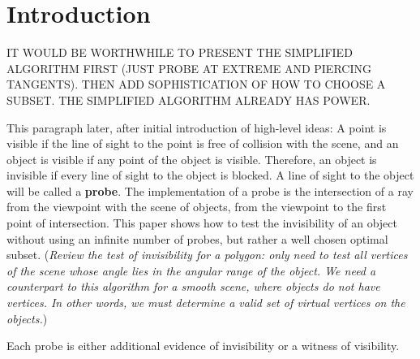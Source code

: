 \documentclass[12pt]{article}
\begin{document}
\clearpage


\section{Introduction}

IT WOULD BE WORTHWHILE TO PRESENT THE SIMPLIFIED ALGORITHM FIRST
(JUST PROBE AT EXTREME AND PIERCING TANGENTS).
THEN ADD SOPHISTICATION OF HOW TO CHOOSE A SUBSET.
THE SIMPLIFIED ALGORITHM ALREADY HAS POWER.

This paragraph later, after initial introduction of high-level ideas:
A point is visible if the line of sight to the point is free of collision with the scene,
and an object is visible if any point of the object is visible.
Therefore, an object is invisible if every line of sight to the object is blocked.
A line of sight to the object will be called a {\bf probe}.
The implementation of a probe is the intersection of a ray from the viewpoint
with the scene of objects, from the viewpoint to the first point of intersection.
This paper shows how to test the invisibility of an object without using an infinite
number of probes, but rather a well chosen optimal subset.
({\em Review the test of invisibility for a polygon: only need to test all vertices of the
scene whose angle lies in the angular range of the object.
We need a counterpart to this algorithm for a smooth scene, where objects do not
have vertices.
In other words, we must determine a valid set of virtual vertices on the objects.})

Each probe is either additional evidence of invisibility or a witness of visibility.
\end{document}
